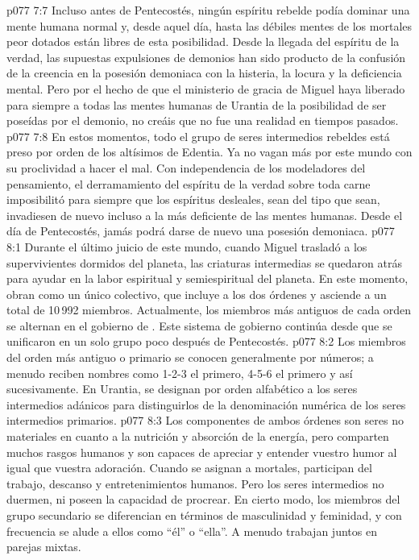 \vs p077 7:7 Incluso antes de Pentecostés, ningún espíritu rebelde podía dominar una mente humana normal y, desde aquel día, hasta las débiles mentes de los mortales peor dotados están libres de esta posibilidad. Desde la llegada del espíritu de la verdad, las supuestas expulsiones de demonios han sido producto de la confusión de la creencia en la posesión demoniaca con la histeria, la locura y la deficiencia mental. Pero por el hecho de que el ministerio de gracia de Miguel haya liberado para siempre a todas las mentes humanas de Urantia de la posibilidad de ser poseídas por el demonio, no creáis que no fue una realidad en tiempos pasados.
\vs p077 7:8 En estos momentos, todo el grupo de seres intermedios rebeldes está preso por orden de los altísimos de Edentia. Ya no vagan más por este mundo con su proclividad a hacer el mal. Con independencia de los modeladores del pensamiento, el derramamiento del espíritu de la verdad sobre toda carne imposibilitó para siempre que los espíritus desleales, sean del tipo que sean, invadiesen de nuevo incluso a la más deficiente de las mentes humanas. Desde el día de Pentecostés, jamás podrá darse de nuevo una posesión demoniaca.
\vs p077 8:1 Durante el último juicio de este mundo, cuando Miguel trasladó a los supervivientes dormidos del planeta, las criaturas intermedias se quedaron atrás para ayudar en la labor espiritual y semiespiritual del planeta. En este momento, obran como un único colectivo, que incluye a los dos órdenes y asciende a un total de 10\,992 miembros. Actualmente, los miembros más antiguos de cada orden se alternan en el gobierno de . Este sistema de gobierno continúa desde que se unificaron en un solo grupo poco después de Pentecostés.
\vs p077 8:2 Los miembros del orden más antiguo o primario se conocen generalmente por números; a menudo reciben nombres como 1\hyp{}2\hyp{}3 el primero, 4\hyp{}5\hyp{}6 el primero y así sucesivamente. En Urantia, se designan por orden alfabético a los seres intermedios adánicos para distinguirlos de la denominación numérica de los seres intermedios primarios.
\vs p077 8:3 Los componentes de ambos órdenes son seres no materiales en cuanto a la nutrición y absorción de la energía, pero comparten muchos rasgos humanos y son capaces de apreciar y entender vuestro humor al igual que vuestra adoración. Cuando se asignan a mortales, participan del trabajo, descanso y entretenimientos humanos. Pero los seres intermedios no duermen, ni poseen la capacidad de procrear. En cierto modo, los miembros del grupo secundario se diferencian en términos de masculinidad y feminidad, y con frecuencia se alude a ellos como “él” o “ella”. A menudo trabajan juntos en parejas mixtas.
